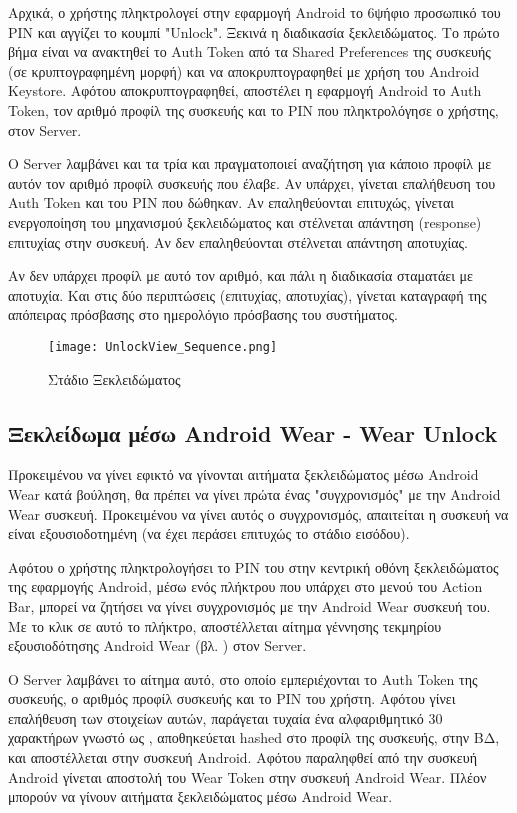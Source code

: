 		Αρχικά, ο χρήστης πληκτρολογεί στην εφαρμογή Android το 6ψήφιο προσωπικό του PIN και αγγίζει το κουμπί "Unlock". Ξεκινά η διαδικασία ξεκλειδώματος. Το πρώτο βήμα είναι να ανακτηθεί το Auth Token από τα Shared Preferences της συσκευής (σε κρυπτογραφημένη μορφή) και να αποκρυπτογραφηθεί με χρήση του Android Keystore. Αφότου αποκρυπτογραφηθεί, αποστέλει η εφαρμογή Android το Auth Token, τον αριθμό προφίλ της συσκευής και το PIN που πληκτρολόγησε ο χρήστης, στον Server.

		Ο Server λαμβάνει και τα τρία και πραγματοποιεί αναζήτηση για κάποιο προφίλ με αυτόν τον αριθμό προφίλ συσκευής που έλαβε. Αν υπάρχει, γίνεται επαλήθευση του Auth Token και του PIN που δώθηκαν. Αν επαληθεύονται επιτυχώς, γίνεται ενεργοποίηση του μηχανισμού ξεκλειδώματος και στέλνεται απάντηση (response) επιτυχίας στην συσκευή. Αν δεν επαληθεύονται στέλνεται απάντηση αποτυχίας.

		Αν δεν υπάρχει προφίλ με αυτό τον αριθμό, και πάλι η διαδικασία σταματάει με αποτυχία. Και στις δύο περιπτώσεις (επιτυχίας, αποτυχίας), γίνεται καταγραφή της απόπειρας πρόσβασης στο ημερολόγιο πρόσβασης του συστήματος.

		\begin{figure}[h]
			\centering
				\texttt{[image: UnlockView\_Sequence.png]}
			\caption{Στάδιο Ξεκλειδώματος}
			\label{fig:unlock_stage}
		\end{figure}

	\subsection{Ξεκλείδωμα μέσω Android Wear - Wear Unlock}
		\label{subsec:wear_unlock}
		Προκειμένου να γίνει εφικτό να γίνονται αιτήματα ξεκλειδώματος μέσω Android Wear κατά βούληση, θα πρέπει να γίνει πρώτα ένας "συγχρονισμός" με την Android Wear συσκευή. Προκειμένου να γίνει αυτός ο συγχρονισμός, απαιτείται η συσκευή να είναι εξουσιοδοτημένη (να έχει περάσει επιτυχώς το στάδιο εισόδου).

		Αφότου ο χρήστης πληκτρολογήσει το PIN του στην κεντρική οθόνη ξεκλειδώματος της εφαρμογής Android, μέσω ενός πλήκτρου που υπάρχει στο μενού του Action Bar, μπορεί να ζητήσει να γίνει συγχρονισμός με την Android Wear συσκευή του. Με το κλικ σε αυτό το πλήκτρο, αποστέλλεται αίτημα γέννησης τεκμηρίου εξουσιοδότησης Android Wear (βλ. ) στον Server.

		Ο Server λαμβάνει το αίτημα αυτό, στο οποίο εμπεριέχονται το Auth Token της συσκευής, ο αριθμός προφίλ συσκευής και το PIN του χρήστη. Αφότου γίνει επαλήθευση των στοιχείων αυτών, παράγεται τυχαία ένα αλφαριθμητικό 30 χαρακτήρων γνωστό ως , αποθηκεύεται hashed στο προφίλ της συσκευής, στην ΒΔ, και αποστέλλεται στην συσκευή Android. Αφότου παραληφθεί από την συσκευή Android γίνεται αποστολή του Wear Token στην συσκευή Android Wear. Πλέον μπορούν να γίνουν αιτήματα ξεκλειδώματος μέσω Android Wear.

